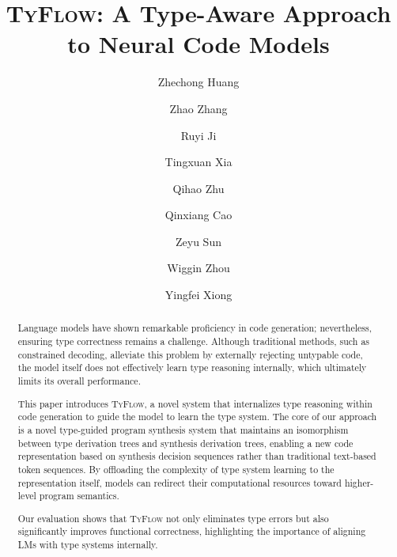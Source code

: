 \documentclass[manuscript,screen]{acmart}
\newcommand{\toolname}[1]{\textsc{#1}}
\newcommand{\mainname}{\toolname{TyFlow}\xspace}
\begin{document}
\title{\mainname: A Type-Aware Approach to Neural Code Models}
\author{Zhechong Huang}
\author{Zhao Zhang}
\author{Ruyi Ji}
\author{Tingxuan Xia}
\author{Qihao Zhu}
\author{Qinxiang Cao}
\author{Zeyu Sun}
\author{Wiggin Zhou}
\author{Yingfei Xiong}


\begin{abstract}
Language models have shown remarkable proficiency in code generation; nevertheless, ensuring type correctness remains a challenge. Although traditional methods, such as constrained decoding, alleviate this problem by externally rejecting untypable code, the model itself does not effectively learn type reasoning internally, which ultimately limits its overall performance. 

This paper introduces \mainname, a novel system that internalizes type reasoning within code generation to guide the model to learn the type system. 
The core of our approach is a novel type-guided program synthesis system that maintains an isomorphism between type derivation trees and synthesis derivation trees, enabling a new code representation based on synthesis decision sequences rather than traditional text-based token sequences. By offloading the complexity of type system learning to the representation itself, models can redirect their computational resources toward higher-level program semantics.

Our evaluation shows that \mainname not only eliminates type errors but also significantly improves functional correctness, highlighting the importance of aligning LMs with type systems internally.

\end{abstract}
\end{document}
